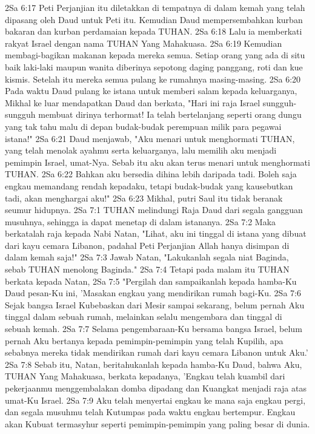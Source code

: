 2Sa 6:17  Peti Perjanjian itu diletakkan di tempatnya di dalam kemah yang telah dipasang oleh Daud untuk Peti itu. Kemudian Daud mempersembahkan kurban bakaran dan kurban perdamaian kepada TUHAN.
2Sa 6:18  Lalu ia memberkati rakyat Israel dengan nama TUHAN Yang Mahakuasa.
2Sa 6:19  Kemudian membagi-bagikan makanan kepada mereka semua. Setiap orang yang ada di situ baik laki-laki maupun wanita diberinya sepotong daging panggang, roti dan kue kismis. Setelah itu mereka semua pulang ke rumahnya masing-masing.
2Sa 6:20  Pada waktu Daud pulang ke istana untuk memberi salam kepada keluarganya, Mikhal ke luar mendapatkan Daud dan berkata, "Hari ini raja Israel sungguh-sungguh membuat dirinya terhormat! Ia telah bertelanjang seperti orang dungu yang tak tahu malu di depan budak-budak perempuan milik para pegawai istana!"
2Sa 6:21  Daud menjawab, "Aku menari untuk menghormati TUHAN, yang telah menolak ayahmu serta keluarganya, lalu memilih aku menjadi pemimpin Israel, umat-Nya. Sebab itu aku akan terus menari untuk menghormati TUHAN.
2Sa 6:22  Bahkan aku bersedia dihina lebih daripada tadi. Boleh saja engkau memandang rendah kepadaku, tetapi budak-budak yang kausebutkan tadi, akan menghargai aku!"
2Sa 6:23  Mikhal, putri Saul itu tidak beranak seumur hidupnya.
2Sa 7:1  TUHAN melindungi Raja Daud dari segala gangguan musuhnya, sehingga ia dapat menetap di dalam istananya.
2Sa 7:2  Maka berkatalah raja kepada Nabi Natan, "Lihat, aku ini tinggal di istana yang dibuat dari kayu cemara Libanon, padahal Peti Perjanjian Allah hanya disimpan di dalam kemah saja!"
2Sa 7:3  Jawab Natan, "Lakukanlah segala niat Baginda, sebab TUHAN menolong Baginda."
2Sa 7:4  Tetapi pada malam itu TUHAN berkata kepada Natan,
2Sa 7:5  "Pergilah dan sampaikanlah kepada hamba-Ku Daud pesan-Ku ini, 'Masakan engkau yang mendirikan rumah bagi-Ku.
2Sa 7:6  Sejak bangsa Israel Kubebaskan dari Mesir sampai sekarang, belum pernah Aku tinggal dalam sebuah rumah, melainkan selalu mengembara dan tinggal di sebuah kemah.
2Sa 7:7  Selama pengembaraan-Ku bersama bangsa Israel, belum pernah Aku bertanya kepada pemimpin-pemimpin yang telah Kupilih, apa sebabnya mereka tidak mendirikan rumah dari kayu cemara Libanon untuk Aku.'
2Sa 7:8  Sebab itu, Natan, beritahukanlah kepada hamba-Ku Daud, bahwa Aku, TUHAN Yang Mahakuasa, berkata kepadanya, 'Engkau telah kuambil dari pekerjaanmu menggembalakan domba dipadang dan Kuangkat menjadi raja atas umat-Ku Israel.
2Sa 7:9  Aku telah menyertai engkau ke mana saja engkau pergi, dan segala musuhmu telah Kutumpas pada waktu engkau bertempur. Engkau akan Kubuat termasyhur seperti pemimpin-pemimpin yang paling besar di dunia.
